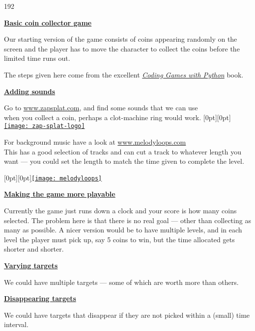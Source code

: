 \documentclass{coderdojo}
\newcommand\contentsitem[2]{
	\item \hyperref[#1]{\color{section}\bfseries #2}
}
\begin{document}
\begin{dingautolist}{192} 
\contentsitem{ball}{Basic coin collector game}%
\quad\dotfill\quad{}

Our starting version of the game consists of coins appearing randomly on the screen and the player has to move the character to collect the coins before the limited time runs out.

The steps given here come from the excellent \href{https://www.dk.com/uk/book/9780241317792-computer-coding-python-games-for-kids/}{\em Coding Games with Python} book.

\contentsitem{rectangle}{Adding sounds}%
\quad\dotfill\quad{}

Go to \href{https://www.zapsplat.com}{www.zapsplat.com}, and find some sounds that we can use\\ when you collect a coin, perhaps a clot-machine ring would work. 
\hfill\raisebox{-12pt}[0pt][0pt]{\href{https://www.zapsplat.com}{\texttt{[image: zap-splat-logo]}}}

\parbox[t]{11cm}{For background music have a look at 
\href{https://www.melodyloops.com/music/}{www.melodyloops.com}\\
This has a good selection of tracks and can cut a track to whatever length you want --- you could set the length to match the time given to complete the level.}
\hfill\raisebox{-18pt}[0pt][0pt]{\href{https://www.melodyloops.com/music/}{{\texttt{[image: melodyloops]}}}}


\contentsitem{rectangle}{Making the game more playable}%
\quad\dotfill\quad{}

Currently the game just runs down a clock and your score is how many coins selected. The problem here is that there is no real goal --- other than collecting as many as possible. A nicer version would be to have multiple levels, and in each level the player must pick up, say 5 coins to win, but the time allocated gets shorter and shorter.
  
\contentsitem{rectangle}{Varying targets}%
\quad\dotfill\quad{}

We could have multiple targets --- some of which are worth more than others. 

\contentsitem{rectangle}{Disappearing targets}%
\quad\dotfill\quad{}

We could have targets that disappear if they are not picked within a (small) time interval.

\end{dingautolist}
\end{document}
